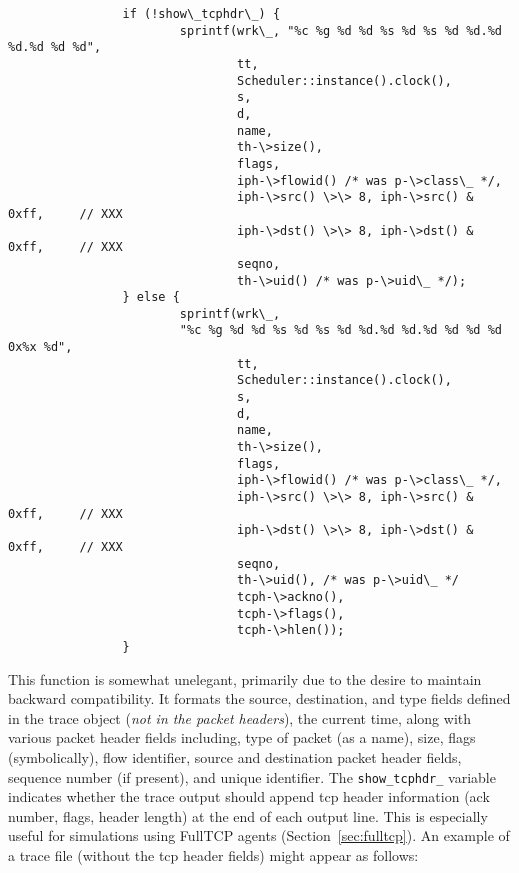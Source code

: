 \begin{verbatim}
                if (!show\_tcphdr\_) {
                        sprintf(wrk\_, "%c %g %d %d %s %d %s %d %d.%d %d.%d %d %d",
                                tt,
                                Scheduler::instance().clock(),
                                s,
                                d,
                                name,
                                th-\>size(),
                                flags,
                                iph-\>flowid() /* was p-\>class\_ */,
                                iph-\>src() \>\> 8, iph-\>src() & 0xff,     // XXX
                                iph-\>dst() \>\> 8, iph-\>dst() & 0xff,     // XXX
                                seqno,
                                th-\>uid() /* was p-\>uid\_ */);
                } else {
                        sprintf(wrk\_,
                        "%c %g %d %d %s %d %s %d %d.%d %d.%d %d %d %d 0x%x %d",
                                tt,
                                Scheduler::instance().clock(),
                                s,
                                d,
                                name,
                                th-\>size(),
                                flags,
                                iph-\>flowid() /* was p-\>class\_ */,
                                iph-\>src() \>\> 8, iph-\>src() & 0xff,     // XXX
                                iph-\>dst() \>\> 8, iph-\>dst() & 0xff,     // XXX
                                seqno,
                                th-\>uid(), /* was p-\>uid\_ */
                                tcph-\>ackno(),
                                tcph-\>flags(),
                                tcph-\>hlen());
                }
\end{verbatim}
This function is somewhat unelegant, primarily due to the desire
to maintain backward compatibility.
It formats the source, destination, and type fields defined in the
trace object ({\em not in the packet headers}), the current time,
along with various packet header fields including,
type of packet (as a name), size, flags (symbolically),
flow identifier, source and destination packet header fields,
sequence number (if present), and unique identifier.
The {\tt show\_tcphdr\_} variable indicates whether the trace
output should append tcp header information (ack number, flags, header length)
at the end of each output line.
This is especially useful for simulations using
FullTCP agents (Section~\ref{sec:fulltcp}).
An example of a trace file (without the tcp header fields) might
appear as follows: 
